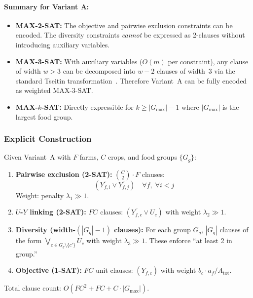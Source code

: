 \documentclass[11pt,a4paper]{article}
\begin{document}
\paragraph{Summary for Variant A:}
\begin{itemize}
  \item \textbf{MAX-2-SAT:} The objective and pairwise exclusion constraints
    can be encoded.  The diversity constraints \emph{cannot} be expressed as
    2-clauses without introducing auxiliary variables.
  \item \textbf{MAX-3-SAT:} With auxiliary variables ($O(m)$ per constraint),
    any clause of width $w > 3$ can be decomposed into $w - 2$ clauses of width~3
    via the standard Tseitin transformation~\cite{tseitin1983complexity}.
    Therefore Variant~A can be fully encoded as weighted MAX-3-SAT.
  \item \textbf{MAX-$k$-SAT:} Directly expressible for $k \ge |G_{\max}| - 1$
    where $|G_{\max}|$ is the largest food group.
\end{itemize}

\subsubsection*{Explicit Construction}

Given Variant~A with $F$ farms, $C$ crops, and food groups $\{G_g\}$:

\begin{enumerate}
  \item \textbf{Pairwise exclusion (2-SAT):}
    $\binom{C}{2} \cdot F$ clauses:
    \[(\overline{Y_{f,i}} \lor \overline{Y_{f,j}}) \quad \forall f, \; \forall i < j\]
    Weight: penalty $\lambda_1 \gg 1$.

  \item \textbf{$U$-$Y$ linking (2-SAT):}
    $FC$ clauses: $(\overline{Y_{f,c}} \lor U_c)$ with weight $\lambda_2 \gg 1$.

  \item \textbf{Diversity (width-$(|G_g|-1)$ clauses):}
    For each group $G_g$, $|G_g|$ clauses of the form
    $\bigvee_{c \in G_g \setminus \{c'\}} U_c$ with weight $\lambda_3 \gg 1$.
    These enforce ``at least 2 in group.''

  \item \textbf{Objective (1-SAT):}
    $FC$ unit clauses: $(Y_{f,c})$ with weight $b_c \cdot a_f / A_{\mathrm{tot}}$.
\end{enumerate}

Total clause count: $O(FC^2 + FC + C \cdot |G_{\max}|)$.
\end{document}
